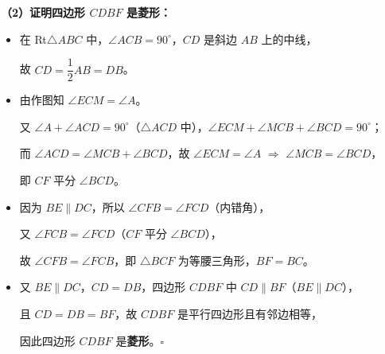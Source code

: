 \begin{center}
\end{center}

\vspace{0.3cm}
\textbf{（2）证明四边形 $CDBF$ 是菱形：}

\begin{itemize}
    \item 在 Rt$\triangle ABC$ 中，$\angle ACB = 90^\circ$，$CD$ 是斜边 $AB$ 上的中线，

    故 $CD = \dfrac{1}{2}AB = DB$。

    \item 由作图知 $\angle ECM = \angle A$。

    又 $\angle A + \angle ACD = 90^\circ$（$\triangle ACD$ 中），$\angle ECM + \angle MCB + \angle BCD = 90^\circ$；

    而 $\angle ACD = \angle MCB + \angle BCD$，故 $\angle ECM = \angle A$ $\Rightarrow$ $\angle MCB = \angle BCD$，

    即 $CF$ 平分 $\angle BCD$。

    \item 因为 $BE \parallel DC$，所以 $\angle CFB = \angle FCD$（内错角），

    又 $\angle FCB = \angle FCD$（$CF$ 平分 $\angle BCD$），

    故 $\angle CFB = \angle FCB$，即 $\triangle BCF$ 为等腰三角形，$BF = BC$。

    \item 又 $BE \parallel DC$，$CD = DB$，四边形 $CDBF$ 中 $CD \parallel BF$（$BE \parallel DC$），

    且 $CD = DB = BF$，故 $CDBF$ 是平行四边形且有邻边相等，

    因此四边形 $CDBF$ 是\textbf{菱形}。$\square$
\end{itemize}

